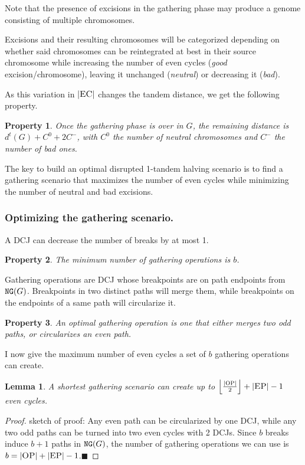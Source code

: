 \documentclass[11pt,final,twoside,nofrench]{thlifl}
\newcommand{\qed}{\ensuremath{\blacksquare}}
\renewcommand{\NG}{\ensuremath{\mbox{\texttt{NG}}}}
\newtheorem{property}{Property}
\newtheorem{proof}{Proof}
\newtheorem{lemma}{Lemma}
\begin{document}
Note that the presence of excisions in the gathering phase may produce a genome consisting of multiple chromosomes.

Excisions and their resulting chromosomes will be categorized depending on whether said chromosomes can be reintegrated at best in their source chromosome while increasing the number of even cycles (\emph{good} excision/chromosome), leaving it unchanged (\emph{neutral}) or decreasing it (\emph{bad}).

As this variation in $|{{\textsc{EC}}}|$ changes the tandem distance, we get the following property.
\begin{property}
Once the gathering phase is over in $G$, the remaining distance is $d^t(G) + C^0 + 2C^-$, with $C^0$ the number of neutral chromosomes and $C^-$ the number of bad ones.
\end{property}

The key to build an optimal disrupted 1-tandem halving scenario is to find a gathering scenario that maximizes the number of even cycles while minimizing the number of neutral and bad excisions.

\subsubsection{Optimizing the gathering scenario.}

A DCJ can decrease the number of breaks by at most 1.

\begin{property}
The minimum number of gathering operations is $b$.
\end{property}

Gathering operations are DCJ whose breakpoints are on path endpoints from $\NG(G)$. Breakpoints in two distinct paths will merge them, while breakpoints on the endpoints of a same path will circularize it.

\begin{property}
An optimal gathering operation is one that either merges two odd paths, or circularizes an even path.
\end{property}

I now give the maximum number of even cycles a set of $b$ gathering operations can create.

\begin{lemma}
A shortest gathering scenario can create up to $\left \lfloor \frac{\left|{{\textsc{OP}}}\right|}{2} \right \rfloor + |{{\textsc{EP}}}| - 1$ even cycles.
\end{lemma}
\begin{proof}
sketch of proof: Any even path can be circularized by one DCJ, while any two odd paths can be turned into two even cycles with 2 DCJs. Since $b$ breaks induce $b+1$ paths in $\NG(G)$, the number of gathering operations we can use is $b = |{{\textsc{OP}}}|+|{{\textsc{EP}}}| - 1$.\qed
\end{proof}
\end{document}
